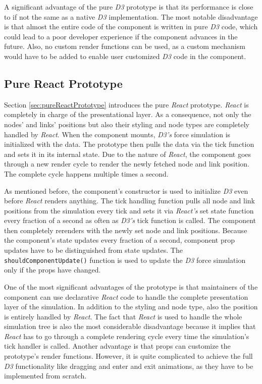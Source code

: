 A sig\-nifi\-cant advantage of the pure \emph{D3} prototype is that its performance is close to if not the same as a native \emph{D3} implementation. The most notable disadvantage is that almost the entire code of the component is written in pure \emph{D3} code, which could lead to a poor developer experience if the component advances in the future. Also, no custom render functions can be used, as a custom mechanism would have to be added to enable user customized \emph{D3} code in the component. 

\subsection{Pure React Prototype}

Section \ref{sec:pureReactPrototype} introduces the pure \emph{React} prototype. \emph{React} is completely in charge of the presentational layer. As a consequence, not only the nodes' and links' positions but also their styling and node types are completely handled by \emph{React}. When the component mounts, \emph{D3's} force simulation is initialized with the data. The prototype then pulls the data via the tick function and sets it in its internal state. Due to the nature of \emph{React}, the component goes through a new render cycle to render the newly fetched node and link position. The complete cycle happens multiple times a second.

As mentioned before, the component's constructor is used to initialize \emph{D3} even before \emph{React} renders anything. The tick handling function pulls all node and link positions from the simulation every tick and sets it via \emph{React's} set state function every fraction of a second as often as \emph{D3's} tick function is called. The component then completely rerenders with the newly set node and link positions. Because the component's state updates every fraction of a second, component prop updates have to be distinguished from state updates. The \texttt{shouldComponentUpdate()} function is used to update the \emph{D3} force simulation only if the props have changed.

One of the most sig\-nifi\-cant advantages of the prototype is that maintainers of the component can use declarative \emph{React} code to handle the complete presentation layer of the simulation. In addition to the styling and node type, also the position is entirely handled by \emph{React}. The fact that \emph{React} is used to handle the whole simulation tree is also the most considerable disadvantage because it implies that \emph{React} has to go through a complete rendering cycle every time the simulation's tick handler is called. Another advantage is that props can customize the prototype's render functions. However, it is quite complicated to achieve the full \emph{D3} functionality like dragging and enter and exit animations, as they have to be implemented from scratch. 

